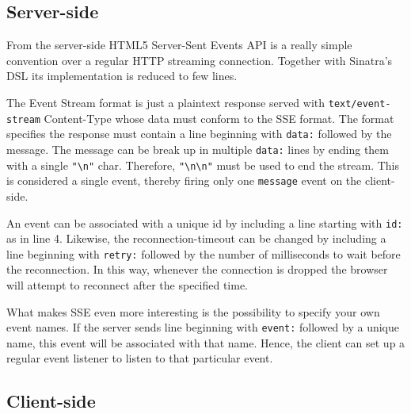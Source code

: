 \subsection*{Server-side}

From the server-side HTML5 Server-Sent Events API is a really simple convention over a regular HTTP streaming connection. Together with Sinatra's DSL its implementation is reduced to few lines.


The Event Stream format is just a plaintext response served with \texttt{text/event-stream} Content-Type whose data must conform to the SSE format. The format specifies the response must contain a line beginning with \texttt{data:} followed by the message. The message can be break up in multiple \texttt{data:} lines by ending them with a single \texttt{"\texttt{\textbackslash n}"} char. Therefore, \texttt{"\textbackslash n\textbackslash n"} must be used to end the stream. This is considered a single event, thereby firing only one \texttt{message} event on the client-side.

An event can be associated with a unique id by including a line starting with \texttt{id:} as in line 4. Likewise, the reconnection-timeout can be changed by including a line beginning with \texttt{retry:} followed by the number of milliseconds to wait before the reconnection. In this way, whenever the connection is dropped the browser will attempt to reconnect after the specified time.

What makes SSE even more interesting is the possibility to specify your own event names. If the server sends line beginning with \texttt{event:} followed by a unique name, this event will be associated with that name. Hence, the client can set up a regular event listener to listen to that particular event.

\subsection*{Client-side}

